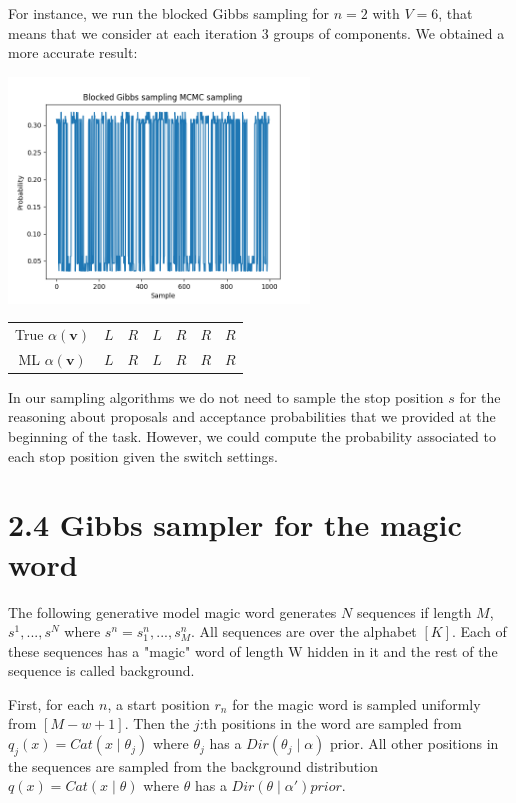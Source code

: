 \documentclass[]{article}
\begin{document}
	For instance, we run the blocked Gibbs sampling for $n=2$ with $V=6$, that means that we consider at each iteration 3 groups of components. We obtained a more accurate result:
	\begin{center}
		\includegraphics[height=6cm]{task3/V_6_T_6_N_10000_Blocked_Gibbs.png}
		\begin{tabular}{| c | c | c | c | c | c | c |}
			True $\alpha(\mathbf{v})$ & $L$ & $R$ & $L$ & $R$ & $R$ & $R$ \\
			ML $\alpha(\mathbf{v})$ & $L$ & $R$ & $L$ & $R$ & $R$ & $R$ \\
		\end{tabular}
	\end{center}
	
	In our sampling algorithms we do not need to sample the stop position $s$ for the reasoning about proposals and acceptance probabilities that we provided at the beginning of the task. However, we could compute the probability associated to each stop position given the switch settings. 
	
	\newpage
	
	\section*{2.4 Gibbs sampler for the magic word}
	
	The following generative model magic word generates $N$ sequences if length $M$, $s^1, ..., s^N $ where $s^n = s_1^n, ... ,s_M^n $. All sequences are over the alphabet $[K]$. Each of these sequences has a "magic" word of length W hidden in it and the rest of the sequence is called background. 
	
	First, for each $n$, a start position $r_n$ for the magic word is sampled uniformly from $[M-w+1]$. Then the $j$:th positions in the word are sampled from $q_j(x)=Cat(x \mid \theta_j)$ where $\theta_j$ has a $Dir( \theta_j \mid \alpha)$ prior. All other positions in the sequences are sampled from the background distribution $q(x) = Cat(x \mid \theta)$ where $\theta$ has a $Dir(\theta \mid \alpha') prior.$
	
\end{document}

